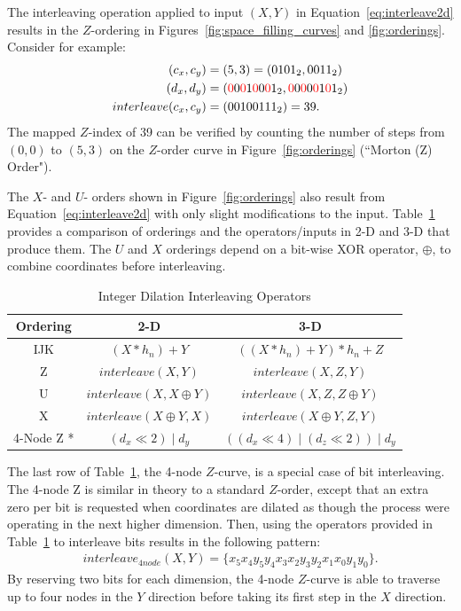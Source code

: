 \documentclass{report}
\begin{document}
The interleaving operation applied to input $(X, Y)$ in Equation~\ref{eq:interleave2d} results in the $Z$-ordering in Figures~\ref{fig:space_filling_curves} and \ref{fig:orderings}. Consider for example:
\begin{align}
(c_x,c_y) & = (5, 3) = (0101_2, 0011_2) \nonumber \\
(d_x,d_y) & =  ({\color{red}0}0{\color{red}0}1{\color{red}0}0{\color{red}0}1_2, {\color{red}0}0{\color{red}0}0{\color{red}0}1{\color{red}0}1_2) \nonumber \\
interleave(c_x, c_y) & = ( 00100111_2 ) = 39. \nonumber
\end{align}
The mapped $Z$-index of 39 can be verified by counting the number of steps from  $(0,0)$ to $(5,3)$ on the $Z$-order curve in Figure~\ref{fig:orderings} (``Morton (Z) Order"). 

The $X$- and $U$- orders shown in Figure~\ref{fig:orderings} also result from Equation~\ref{eq:interleave2d} with only slight modifications to the input. Table~\ref{tbl:orderings} provides a comparison of orderings and the operators/inputs in 2-D and 3-D that produce them. The $U$ and $X$ orderings depend on a bit-wise XOR operator, $\oplus$, to combine coordinates before interleaving. 

\begin{table}
\centering
\caption{Integer Dilation Interleaving Operators}
\label{tbl:orderings}
\begin{tabular}{ c | c | c }
  Ordering & 2-D & 3-D \\
  \hline                        
  IJK & $(X * h_n) + Y$ & $((X * h_n) + Y)*h_n + Z$ \\
  Z & $interleave(X, Y)$ & $interleave(X, Z, Y)$ \\
  U & $interleave(X, X \oplus Y)$ & $interleave(X, Z, Z \oplus Y)$ \\
  X & $interleave(X \oplus Y, X)$ & $interleave(X \oplus Y, Z, Y)$ \\
  4-Node Z * & $(d_x \ll 2) \mid d_y$ & $((d_x \ll 4) \mid (d_z \ll 2)) \mid d_y$ \\
  \hline  
\end{tabular}
\end{table}


The last row of Table~\ref{tbl:orderings}, the 4-node $Z$-curve, is a special case of bit interleaving. The 4-node Z is similar in theory to a standard $Z$-order, except that an extra zero per bit is requested when coordinates are dilated as though the process were operating in the next higher dimension. Then, using the operators provided in Table~\ref{tbl:orderings} to interleave bits results in the following pattern:
\begin{align*}
interleave_{4node}(X,Y) = \{x_5x_4y_5y_4x_3x_2y_3y_2x_1x_0y_1y_0\}.
\end{align*}
By reserving two bits for each dimension, the 4-node $Z$-curve is able to traverse up to four nodes in the $Y$ direction before taking its first step in the $X$ direction. 
\end{document}
